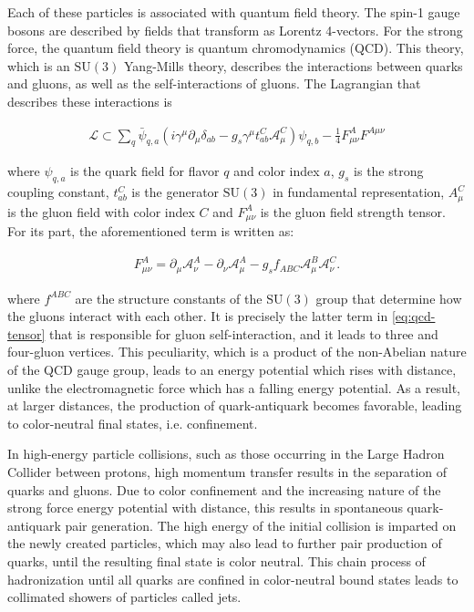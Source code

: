 Each of these particles is associated with quantum field theory. The spin-1 gauge bosons are described by fields that transform as Lorentz 4-vectors. For the strong force, the quantum field theory is quantum chromodynamics (QCD). This theory, which is an $\text{SU}(3)$ Yang-Mills theory, describes the interactions between quarks and gluons, as well as the self-interactions of gluons. The Lagrangian that describes these interactions is

\begin{align}
    \mathcal L\subset \sum_q \bar{\psi}_{q,a}\left(i\gamma^\mu \partial_\mu \delta_{ab} - g_s\gamma^\mu t_{ab}^C \mathcal A_\mu^C\right)\psi_{q,b} - \frac14 F^{A}_{\mu\nu}F^{A\mu\nu}
\end{align}

where $\psi_{q,a}$ is the quark field for flavor $q$ and color index $a$, $g_s$ is the strong coupling constant, $t_{ab}^C$ is the generator $\text{SU}(3)$ in fundamental representation, $A_\mu^C$ is the gluon field with color index $C$ and $F_{\mu\nu}^A$ is the gluon field strength tensor. For its part, the aforementioned term is written as:

\begin{align}
    F^A_{\mu\nu} = \partial_\mu \mathcal A_\nu^A - \partial_\nu\mathcal A_\mu^A - g_s f_{ABC}\mathcal A_\mu^B\mathcal A_\nu^C.
    \label{eq:qcd-tensor}
\end{align}

where $f^{ABC}$ are the structure constants of the $\text{SU}(3)$ group that determine how the gluons interact with each other. It is precisely the latter term in \ref{eq:qcd-tensor} that is responsible for gluon self-interaction, and it leads to three and four-gluon vertices. This peculiarity, which is a product of the non-Abelian nature of the QCD gauge group, leads to an energy potential which rises with distance, unlike the electromagnetic force which has a falling energy potential. As a result, at larger distances, the production of quark-antiquark becomes favorable, leading to color-neutral final states, i.e. confinement.

In high-energy particle collisions, such as those occurring in the Large Hadron Collider between protons, high momentum transfer results in the separation of quarks and gluons. Due to color confinement and the increasing nature of the strong force energy potential with distance, this results in spontaneous quark-antiquark pair generation. The high energy of the initial collision is imparted on the newly created particles, which may also lead to further pair production of quarks, until the resulting final state is color neutral. This chain process of hadronization until all quarks are confined in color-neutral bound states leads to collimated showers of particles called jets. 

